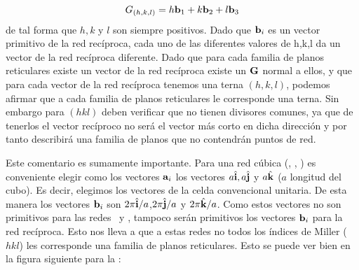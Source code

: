 \begin{equation}
	G_{(h,k,l)} = h \mathbf{b}_1 + k\mathbf{b}_2 + l \mathbf{b}_3
\end{equation}
de tal forma que $h,k$ y $l$ son siempre positivos. Dado que $\mathbf{b}_i$ es un vector primitivo de la red recíproca, cada uno de las diferentes valores de h,k,l da un vector de la red recíproca diferente. Dado que para cada familia de planos reticulares existe un vector de la red recíproca existe un $\mathbf{G}$ normal a ellos, y que para cada vector de la red recíproca tenemos una terna $(h,k,l)$, podemos afirmar que a cada familia de planos reticulares le corresponde una terna. Sin embargo para $(hkl)$ deben verificar que no tienen divisores comunes, ya que de tenerlos el vector recíproco no será el vector más corto en dicha dirección y por tanto describirá una familia de planos que no contendrán puntos de red.

Este comentario es sumamente importante. Para una red cúbica (\sc, \fcc, \bcc) es conveniente elegir como los vectores $\mathbf{a}_i$ los vectores $a\hat{\mathbf{i}},a\hat{\mathbf{j}}$ y $a\hat{\mathbf{k}}$ ($a$ longitud del cubo). Es decir, elegimos los vectores de la celda convencional unitaria. De esta manera los vectores $\mathbf{b}_i$ son $2\pi\hat{\mathbf{i}}/a$,$2\pi\hat{\mathbf{j}}/a$ y $2\pi\hat{\mathbf{k}}/a$. Como estos vectores no son primitivos para las redes \fcc \ y \bcc, tampoco serán primitivos los vectores $\mathbf{b}_i$ para la red recíproca. Esto nos lleva a que a estas redes no todos los índices de Miller ($hkl$) les corresponde una familia de planos reticulares. Esto se puede ver bien en la figura siguiente para la \bcc:

